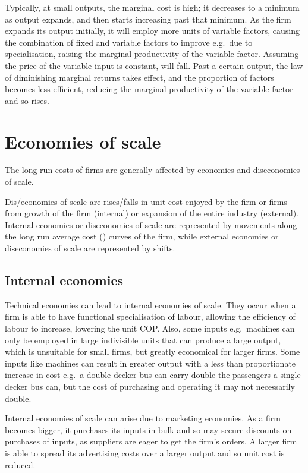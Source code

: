\documentclass[Economics.tex]{subfiles}
\begin{document}
Typically, at small outputs, the marginal cost is high; it decreases to a minimum as output expands, and then starts increasing past that minimum. As the firm expands its output initially, it will employ more units of variable factors, causing the combination of fixed and variable factors to improve e.g.\ due to specialisation, raising the marginal productivity of the variable factor. Assuming the price of the variable input is constant,  will fall. Past a certain output, the law of diminishing marginal returns takes effect, and the proportion of factors becomes less efficient, reducing the marginal productivity of the variable factor and so  rises.
\section{Economies of scale}
The long run costs of firms are generally affected by economies and diseconomies of scale.

Dis\slash{}economies of scale are rises\slash{}falls in unit cost enjoyed by the firm or firms from growth of the firm (internal) or expansion of the entire industry (external). Internal economies or diseconomies of scale are represented by movements along the long run average cost () curves of the firm, while external economies or diseconomies of scale are represented by  shifts.
\subsection{Internal economies}
Technical economies can lead to internal economies of scale. They occur when a firm is able to have functional specialisation of labour, allowing the efficiency of labour to increase, lowering the unit COP. Also, some inputs e.g.\ machines can only be employed in large indivisible units that can produce a large output, which is unsuitable for small firms, but greatly economical for larger firms. Some inputs like machines can result in greater output with a less than proportionate increase in cost e.g.\ a double decker bus can carry double the passengers a single decker bus can, but the cost of purchasing and operating it may not necessarily double.

Internal economies of scale can arise due to marketing economies. As a firm becomes bigger, it purchases its inputs in bulk and so may secure discounts on purchases of inputs, as suppliers are eager to get the firm's orders. A larger firm is able to spread its advertising costs over a larger output and so unit cost is reduced.
\end{document}
